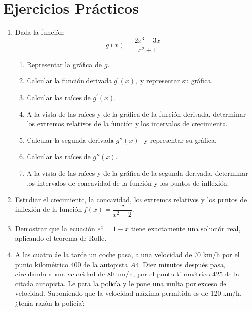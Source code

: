 \documentclass[a4paper]{article}
\begin{document}
\section*{Ejercicios Prácticos}
\begin{enumerate}[leftmargin=*]
\item  Dada la función:
\[
g(x)=\dfrac{2x^{3}-3x}{x^{2}+1}
\]

\begin{enumerate}
\item  Representar la gráfica de $g$.

\item  Calcular la función derivada $g^{\prime }(x),$ y representar su
gráfica.

\item  Calcular las raíces de $g^{\prime }(x).$

\item  A la vista de las raíces y de la gráfica de la función
derivada, determinar los extremos relativos de la función y los
intervalos de crecimiento.

\item Calcular la segunda derivada $g''(x),$ y representar su
gráfica.

\item  Calcular las raíces de $g''(x).$

\item  A la vista de las raíces y de la gráfica de la segunda
derivada, determinar los intervalos de concavidad de la función y los puntos de inflexión.
\end{enumerate}

\item Estudiar el crecimiento, la concavidad, los extremos relativos y los puntos de inflexión de la función $f(x)=\dfrac{x}{x^2-2}$.

\item  Demostrar que la ecuación $e^x=1-x$ tiene exactamente
una solución real, aplicando el teorema de Rolle.

\item  A las cuatro de la tarde un coche pasa, a una velocidad de 70
km/h por el punto kilométrico 400 de la autopista $A4$. Diez
minutos después pasa, circulando a una velocidad de 80 km/h, por
el punto kilométrico 425 de la citada autopista. Le para la
policía y le pone una multa por exceso de velocidad. Suponiendo que la velocidad máxima permitida es de 120 km/h, 
¿tenía razón la policía?
\end{enumerate}
\end{document}
